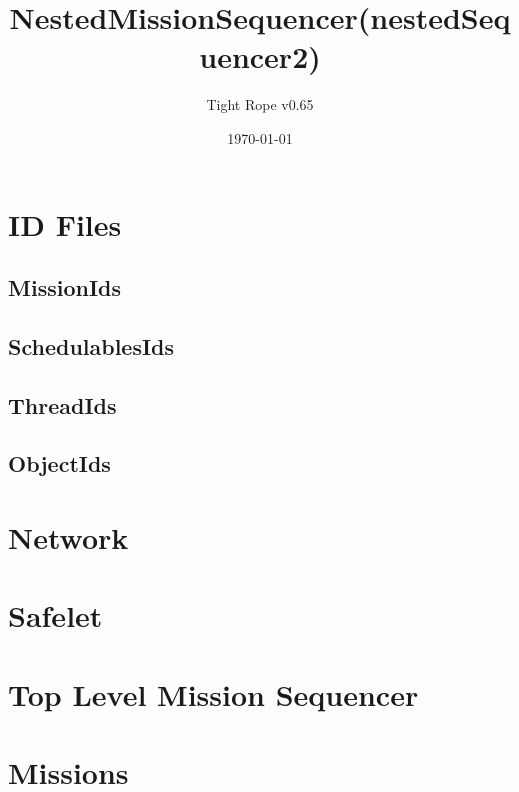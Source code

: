\documentclass[10pt,a4paper]{article}
\title{NestedMissionSequencer(nestedSequencer2)}
\author{Tight Rope v0.65}
\date{\today}
\begin{document}
\maketitle

\section{ID Files}
\subsection{MissionIds}

\newpage

\subsection{SchedulablesIds}

\newpage

\subsection{ThreadIds}

\newpage

\subsection{ObjectIds}

\newpage

\section{Network}

\newpage


\section{Safelet}

\newpage
{}
\newpage

\section{Top Level Mission Sequencer}

\newpage
{}
\newpage

\section{Missions}
\end{document}
